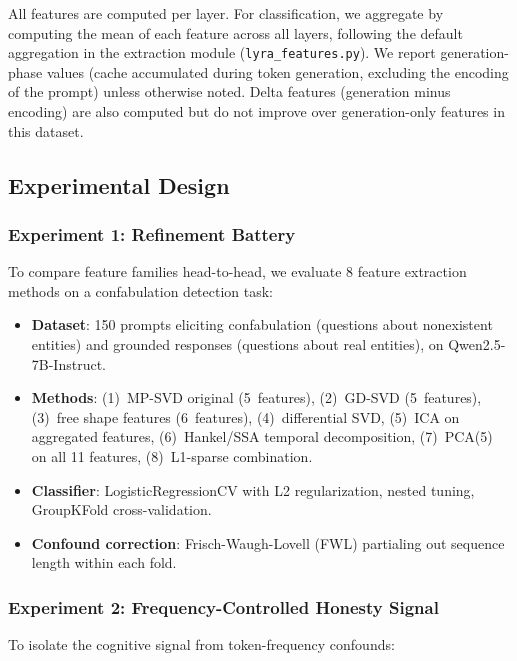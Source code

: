 \documentclass[11pt,a4paper]{article}
\begin{document}
All features are computed per layer. For classification, we aggregate
by computing the mean of each feature across all layers, following the
default aggregation in the extraction module
(\texttt{lyra\_features.py}). We report generation-phase values (cache
accumulated during token generation, excluding the encoding of the
prompt) unless otherwise noted. Delta features (generation minus
encoding) are also computed but do not improve over generation-only
features in this dataset.

\subsection{Experimental Design}

\subsubsection{Experiment 1: Refinement Battery}

To compare feature families head-to-head, we evaluate 8 feature
extraction methods on a confabulation detection task:

\begin{itemize}
\item \textbf{Dataset}: 150 prompts eliciting confabulation (questions
  about nonexistent entities) and grounded responses (questions about
  real entities), on Qwen2.5-7B-Instruct.
\item \textbf{Methods}: (1)~MP-SVD original (5~features),
  (2)~GD-SVD (5~features), (3)~free shape features (6~features),
  (4)~differential SVD, (5)~ICA on aggregated features,
  (6)~Hankel/SSA temporal decomposition, (7)~PCA(5) on all 11
  features, (8)~L1-sparse combination.
\item \textbf{Classifier}: LogisticRegressionCV with L2
  regularization, nested tuning, GroupKFold cross-validation.
\item \textbf{Confound correction}: Frisch-Waugh-Lovell (FWL)
  partialing out sequence length within each fold.
\end{itemize}

\subsubsection{Experiment 2: Frequency-Controlled Honesty Signal}

To isolate the cognitive signal from token-frequency confounds:
\end{document}
